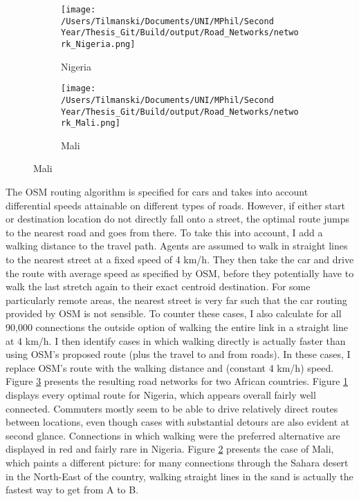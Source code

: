 \documentclass[11pt, oneside]{article}   	%
\begin{document}
\begin{figure}[t]
\centering
\caption{Road Networks for different countries as scraped off OSM}

\begin{subfigure}[c]{0.48\textwidth}
\texttt{[image: /Users/Tilmanski/Documents/UNI/MPhil/Second Year/Thesis\_Git/Build/output/Road\_Networks/network\_Nigeria.png]}
\caption{Nigeria}
\label{fig:nigeria_roads}
\end{subfigure}
\begin{subfigure}[c]{0.48\textwidth}
\texttt{[image: /Users/Tilmanski/Documents/UNI/MPhil/Second Year/Thesis\_Git/Build/output/Road\_Networks/network\_Mali.png]}
\caption{Mali}
\label{fig:Mali_roads}
\end{subfigure}
\label{fig:roads}
\end{figure}

The OSM routing algorithm is specified for cars and takes into account differential speeds attainable on different types of roads. However, if either start or destination location do not directly fall onto a street, the optimal route jumps to the nearest road and goes from there. To take this into account, I add a walking distance to the travel path. Agents are assumed to walk in straight lines to the nearest street at a fixed speed of 4 km/h. They then take the car and drive the route with average speed as specified by OSM, before they potentially have to walk the last stretch again to their exact centroid destination. For some particularly remote areas, the nearest street is very far such that the car routing provided by OSM is not sensible. To counter these cases, I also calculate for all 90,000 connections the outside option of walking the entire link in a straight line at 4 km/h. I then identify cases in which walking directly is actually faster than using OSM's proposed route (plus the travel to and from roads). In these cases, I replace OSM's route with the walking distance and (constant 4 km/h) speed. Figure \ref{fig:roads} presents the resulting road networks for two African countries. Figure \ref{fig:nigeria_roads} displays every optimal route for Nigeria, which appears overall fairly well connected. Commuters mostly seem to be able to drive relatively direct routes between locations, even though cases with substantial detours are also evident at second glance. Connections in which walking were the preferred alternative are displayed in red and fairly rare in Nigeria. Figure \ref{fig:Mali_roads} presents the case of Mali, which paints a different picture: for many connections through the Sahara desert in the North-East of the country, walking straight lines in the sand is actually the fastest way to get from A to B.
\end{document}
